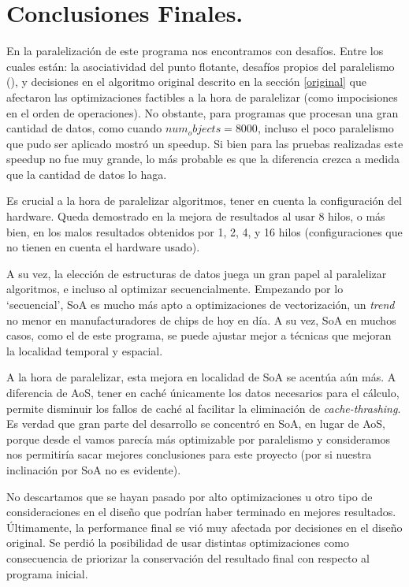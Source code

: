 \documentclass{article}
\begin{document}
\section{Conclusiones Finales.\label{conclusiones}}
En la paralelización de este programa nos encontramos con desafíos. Entre los cuales están: la asociatividad
del punto flotante, desafíos propios del paralelismo (), y decisiones en el algoritmo original descrito en
la sección \ref{original} que afectaron las optimizaciones factibles a la hora de paralelizar (como impocisiones
en el orden de operaciones). No obstante, para programas que procesan una gran cantidad de datos, como cuando ${num_objects=8000}$,
incluso el poco paralelismo que pudo ser aplicado mostró un speedup. Si bien para las pruebas realizadas este speedup no fue
muy grande, lo más probable es que la diferencia crezca a medida que la cantidad de datos lo haga.


Es crucial a la hora de paralelizar algoritmos, tener en cuenta la configuración del hardware. Queda demostrado
en la mejora de resultados al usar 8 hilos, o más bien, en los malos resultados obtenidos por 1, 2, 4, y 16 hilos (configuraciones
que no tienen en cuenta el hardware usado).


A su vez, la elección de estructuras de datos juega un gran papel al paralelizar algoritmos, e incluso al optimizar secuencialmente.
Empezando por lo `secuencial', SoA es mucho más apto a optimizaciones de vectorización, un \textit{trend} no menor en manufacturadores
de chips de hoy en día. A su vez, SoA en muchos casos, como el de este programa, se puede ajustar mejor a técnicas que mejoran
la localidad temporal y espacial.

A la hora de paralelizar, esta mejora en localidad de SoA se acentúa aún más. A diferencia de AoS, tener en caché únicamente
los datos necesarios para el cálculo, permite disminuir los fallos de caché al
facilitar la eliminación de \textit{cache-thrashing}. Es verdad que gran parte del desarrollo se concentró en SoA, en lugar de AoS, porque
desde el vamos parecía más optimizable por paralelismo y consideramos nos permitiría sacar mejores conclusiones para este proyecto (por
si nuestra inclinación por SoA no es evidente).

No descartamos que se hayan pasado por alto optimizaciones u otro tipo de consideraciones
en el diseño que podrían haber terminado en mejores resultados. Últimamente, la performance final se vió muy
afectada por decisiones en el diseño original. Se perdió la posibilidad de usar distintas optimizaciones
como consecuencia de priorizar la conservación del resultado final con respecto al programa inicial.

\printbibliography
\end{document}
